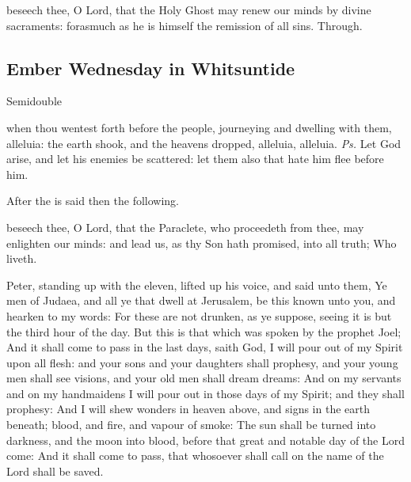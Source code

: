 \postcommunion
{} beseech thee, O Lord, that the Holy Ghost may renew our minds by divine sacraments: forasmuch as he is himself the remission of all sins. Through.


\clearpage
\subsection{Ember Wednesday in Whitsuntide}
\begin{inhead}
    {Semidouble}
\end{inhead}

\introit
{} when thou wentest forth before the people, journeying and dwelling with them, alleluia: the earth shook, and the heavens dropped, alleluia, alleluia. \textit{Ps.} Let God arise, and let his enemies be scattered: let them also that hate him flee before him.

\begin{rubric}
	After the  is said  then the following.
\end{rubric}

\collect
{} beseech thee, O Lord, that the Paraclete, who proceedeth from thee, may enlighten our minds: and lead us, as thy Son hath promised, into all truth; Who liveth.

 Peter, standing up with the eleven, lifted up his voice, and said unto them, Ye men of Judaea, and all ye that dwell at Jerusalem, be this known unto you, and hearken to my words: For these are not drunken, as ye suppose, seeing it is but the third hour of the day. But this is that which was spoken by the prophet Joel; And it shall come to pass in the last days, saith God, I will pour out of my Spirit upon all flesh: and your sons and your daughters shall prophesy, and your young men shall see visions, and your old men shall dream dreams: And on my servants and on my handmaidens I will pour out in those days of my Spirit; and they shall prophesy: And I will shew wonders in heaven above, and signs in the earth beneath; blood, and fire, and vapour of smoke: The sun shall be turned into darkness, and the moon into blood, before that great and notable day of the Lord come: And it shall come to pass, that whosoever shall call on the name of the Lord shall be saved.


